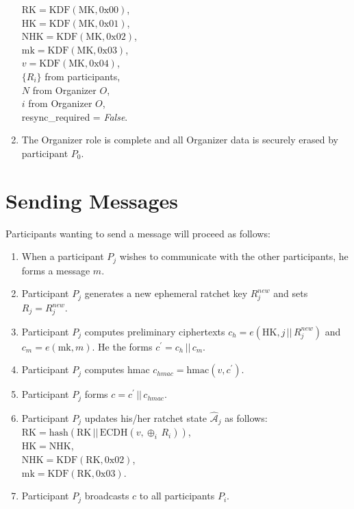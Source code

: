 \documentclass[%
preprint,
amsmath,amssymb,
aps,
prb,
floatfix,
]{revtex4-1}
\begin{document}
\begin{enumerate}
$\mathrm{RK} = \mathrm{KDF}(\mathrm{MK}, 0\mathrm{x}00)$, \\
$\mathrm{HK} = \mathrm{KDF}(\mathrm{MK}, 0\mathrm{x}01)$, \\
$\mathrm{NHK} = \mathrm{KDF}(\mathrm{MK}, 0\mathrm{x}02)$, \\
$\mathrm{mk} = \mathrm{KDF}(\mathrm{MK}, 0\mathrm{x}03)$, \\
$v = \mathrm{KDF}(\mathrm{MK}, 0\mathrm{x}04)$, \\
$\{R_i\}$ from participants, \\
$N$ from Organizer $O$, \\
$i$ from Organizer $O$, \\
resync\_required = \textit{False}.
\item The Organizer role is complete and all Organizer data
is securely erased by participant $P_0$.
\end{enumerate}

\section{\label{sec:sending}Sending Messages}
Participants wanting to send a message will proceed as follows:
\begin{enumerate}
\item When a participant $P_j$ wishes to communicate with the other
participants, he forms a message $m$.
\item Participant $P_j$ generates a new ephemeral ratchet key $R_j^{new}$ and
sets $R_j = R_j^{new}$.
\item Participant $P_j$ computes preliminary ciphertexts $c_h = e(\mathrm{HK}, j
\, || \, R_j^{new})$ and $c_m = e(\mathrm{mk}, m)$. He the forms $c^\prime = c_h
\, || \, c_m$.
\item Participant $P_j$ computes hmac $c_{hmac} = \mathrm{hmac}(v, c^\prime)$.
\item Participant $P_j$ forms $c = c^\prime \, || \, c_{hmac}$.
\item Participant $P_j$ updates his/her ratchet state $\mathcal{\hat{A}}_j$ as
follows:\\
$\mathrm{RK} = \mathrm{hash}(\mathrm{RK} \, || \, \mathrm{ECDH}(v, \oplus_i
\, R_i))$, \\
$\mathrm{HK} = \mathrm{NHK}$, \\
$\mathrm{NHK} = \mathrm{KDF}(\mathrm{RK}, 0\mathrm{x}02)$, \\
$\mathrm{mk} = \mathrm{KDF}(\mathrm{RK}, 0\mathrm{x}03)$.
\item Participant $P_j$ broadcasts $c$ to all participants $P_i$.
\end{enumerate}
\end{document}
